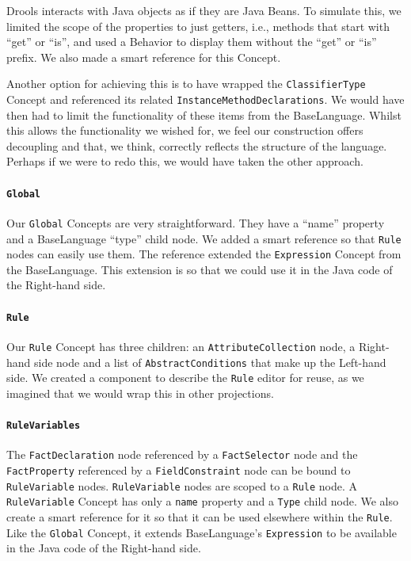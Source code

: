 Drools interacts with Java objects as if they are Java Beans.
To simulate this, we limited the scope of the properties to just getters, i.e., methods that start with ``get'' or ``is'', and used a Behavior to display them without the ``get'' or ``is'' prefix.
We also made a smart reference for this Concept.

Another option for achieving this is to have wrapped the \texttt{ClassifierType} Concept and referenced its related \texttt{InstanceMethodDeclarations}.
We would have then had to limit the functionality of these items from the BaseLanguage.
Whilst this allows the functionality we wished for, we feel our construction offers decoupling and that, we think, correctly reflects the structure of the language.
Perhaps if we were to redo this, we would have taken the other approach.

\paragraph{\texttt{Global}} Our \texttt{Global} Concepts are very straightforward.
They have a ``name'' property and a BaseLanguage ``type'' child node.
We added a smart reference so that \texttt{Rule} nodes can easily use them.
The reference extended the \texttt{Expression} Concept from the BaseLanguage.
This extension is so that we could use it in the Java code of the Right-hand side.

\paragraph{\texttt{Rule}} Our \texttt{Rule} Concept has three children: an \texttt{AttributeCollection} node, a Right-hand side node and a list of \texttt{AbstractConditions} that make up the Left-hand side.
We created a component to describe the \texttt{Rule} editor for reuse, as we imagined that we would wrap this in other projections.

\paragraph{\texttt{RuleVariables}} The \texttt{FactDeclaration} node referenced by a \texttt{FactSelector} node and the \texttt{FactProperty} referenced by a \texttt{FieldConstraint} node can be bound to \texttt{RuleVariable} nodes.
\texttt{RuleVariable} nodes are scoped to a \texttt{Rule} node.
A \texttt{RuleVariable} Concept has only a \texttt{name} property and a \texttt{Type} child node.
We also create a smart reference for it so that it can be used elsewhere within the \texttt{Rule}.
Like the \texttt{Global} Concept, it extends BaseLanguage's \texttt{Expression} to be available in the Java code of the Right-hand side.

